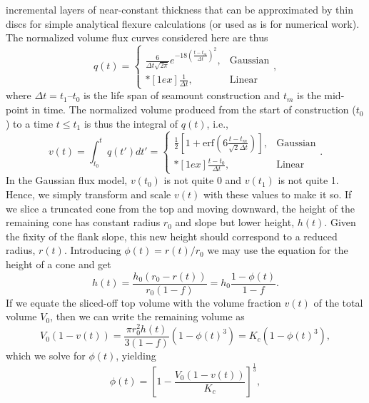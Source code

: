 incremental layers of near-constant thickness that can be approximated by thin discs for simple analytical
flexure calculations (or used as is for numerical work). The normalized volume flux curves considered here are thus
\begin{equation*}
q(t) = \left \{ \begin{array}{cl}
	\frac{6}{\Delta t \sqrt{2 \pi}} e^{-18\left (\frac{t - t_m}{\Delta t} \right )^2}, &	\mbox{Gaussian} \\*[1ex]
	\frac{1}{\Delta t}, & \mbox{Linear}
\end{array} \right.,
\end{equation*}
where $\Delta t = t_1 – t_0$ is the life span of seamount construction and $t_m$ is the mid-point in time.
The normalized volume produced from the start of construction ($t_0$) to a time $t \leq t_1$ is thus the
integral of $q(t)$, i.e.,
\begin{equation}
v(t) = \int_{t_0}^t q(t')dt' = \left \{ \begin{array}{cl}
	\frac{1}{2} \left [ 1 + \mbox{erf}{\left (6\frac{t - t_m}{\sqrt{2}\Delta t} \right )} \right ], &	\mbox{Gaussian} \\*[1ex]
	\frac{t - t_0}{\Delta t}, & \mbox{Linear}
\end{array} \right ..
\label{eq:flux}
\end{equation}
In the Gaussian flux model, $v(t_0)$ is not quite 0 and $v(t_1)$ is not quite 1. Hence, we simply transform
and scale $v(t)$ with these values to make it so.
If we slice a truncated cone from the top and moving downward, the height of the remaining cone has constant
radius $r_0$ and slope but lower height, $h(t)$.  Given the fixity of the flank slope, this new height
should correspond to a reduced radius, $r(t)$.  Introducing
$\phi(t) = r(t)/r_0$ we may use the equation for the height of a cone and get
\begin{equation*}
h(t) = \frac{h_0 (r_0 - r(t))}{r_0 (1-f)} = h_0\frac{1 - \phi(t)}{1 - f}.
\end{equation*}
If we equate the sliced-off top volume with the volume fraction $v(t)$ of the total volume $V_0$,
then we can write the remaining volume as
\begin{equation*}
V_0 (1 - v(t)) = \frac{\pi r_0^2 h(t)}{3 (1-f)} (1 - \phi(t)^3) = K_c (1 - \phi(t)^3),
\end{equation*}
which we solve for $\phi(t)$, yielding
\begin{equation*}
\phi(t) = \left [1 - \frac{V_0 (1 - v(t))}{K_c} \right ]^{\frac{1}{3}},
\end{equation*}
